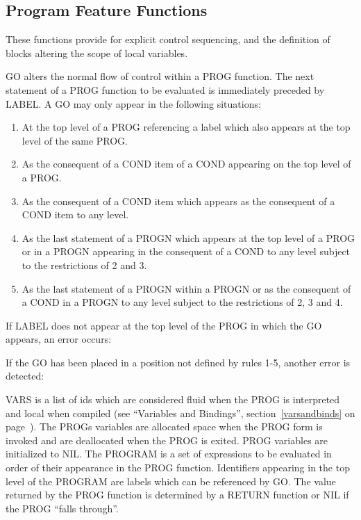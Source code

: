 \documentclass[11pt,letterpaper]{book}
\begin{document}
\subsection{Program Feature Functions}
\label{prog}
These functions provide for explicit control sequencing, and the
definition of blocks altering the scope of local variables.


{GO alters the normal flow of control within a PROG function. The next
statement of a PROG function to be evaluated is immediately preceded
by LABEL. A GO may only appear in the following situations:


\begin{enumerate}
\item At the top level of a PROG referencing a label which also
appears at the top level of the same PROG.

\item As the consequent of a COND item of a COND appearing on the top
level of a PROG.
\item As the consequent of a COND item which appears as the
consequent of a COND item to any level.

\item As the last statement of a PROGN which appears at the top level
of a PROG or in a PROGN appearing in the consequent of a COND to any
level subject to the restrictions of 2 and 3.

\item As the last statement of a PROGN within a PROGN or as the
consequent of a COND in a PROGN to any level subject to the
restrictions of 2, 3 and 4.
\end{enumerate}

If LABEL does not appear at the top level of the PROG in which the GO
appears, an error occurs:


If the GO has been placed in a position not defined by rules 1-5,
another error is detected:

}

{VARS is a list of ids which are considered fluid when the PROG is
interpreted and local when compiled (see ``Variables and Bindings'',
section~\ref{varsandbinds} on page~\pageref{varsandbinds}). The PROGs
variables are allocated space when the PROG form is invoked and are
deallocated when the PROG is exited. PROG variables are initialized to
NIL. The PROGRAM is a set of expressions to be evaluated in order of
their appearance in the PROG function.  Identifiers appearing in the
top level of the PROGRAM are labels which can be referenced by GO. The
value returned by the PROG function is determined by a RETURN function
or NIL if the PROG ``falls through''.}
\end{document}
